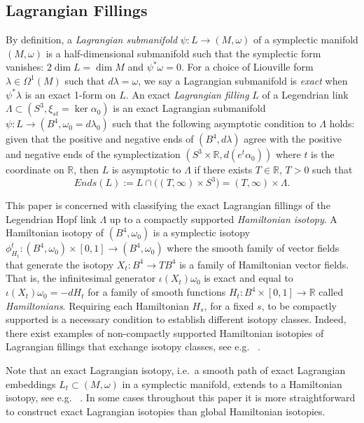 \documentclass[10pt]{amsart}
\theoremstyle{plain}
\theoremstyle{definition}
\numberwithin{equation}{section}
\newcommand{\R}{\mathbb{R}}
\newcommand{\La}{\Lambda}
\newcommand{\sse}{\subset}
\begin{document}
\subsection{Lagrangian Fillings}\label{sec:Lagr_def} By definition, a \textit{Lagrangian submanifold} $\psi:L\to (M,\omega)$ of a symplectic manifold $(M,\omega)$ is a half-dimensional submanifold such that the symplectic form vanishes: $2\dim L = \dim M$ and $\psi^*\omega = 0$. For a choice of Liouville form $\lambda \in \Omega^1(M)$ such that $d\lambda = \omega$, we say a Lagrangian submanifold is \textit{exact} when $\psi^*\lambda$ is an exact 1-form on $L$. An exact \textit{Lagrangian filling} $L$ of a Legendrian link $\La\sse (S^3,\xi_{st}=\ker \alpha_0)$ is an exact Lagrangian submanifold $\psi:L\to (B^4,\omega_0 = d\lambda_0)$ such that the following asymptotic condition to $\La$ holds: given that the positive and negative ends of $(B^4,d\lambda)$ agree with the positive and negative ends of the symplectization $(S^3\times \R, d(e^t\alpha_0))$ where $t$ is the coordinate on $\R$, then $L$ is asymptotic to $\Lambda$ if there exists $T\in \R$, $T>0$ such that
$$Ends(L):=L\cap \big((T,\infty)\times S^3\big) = (T,\infty)\times \Lambda.$$

This paper is concerned with classifying the exact Lagrangian fillings of the Legendrian Hopf link $\Lambda$ up to a compactly supported \textit{Hamiltonian isotopy}. A Hamiltonian isotopy of $(B^4,\omega_0)$ is a symplectic isotopy $\phi^t_{H_t}:(B^4,\omega_0)\times [0,1]\to (B^4,\omega_0)$ where the smooth family of vector fields that generate the isotopy $X_t:B^4\to TB^4$ is a family of Hamiltonian vector fields. That is, the infinitesimal generator $\iota (X_t)\omega_0$ is exact and equal to $\iota (X_t)\omega_0 = -dH_t$ for a family of smooth functions $H_t:B^4\times [0,1]\to \R$ called \textit{Hamiltonians}. Requiring each Hamiltonian $H_s$, for a fixed $s$, to be compactly supported is a necessary condition to establish different isotopy classes. Indeed, there exist examples of non-compactly supported Hamiltonian isotopies of Lagrangian fillings that exchange isotopy classes, see e.g.~ \cite{Casals22_braidloopsinfinitemonodromy}.

Note that an exact Lagrangian isotopy, i.e.~a smooth path of exact Lagrangian embeddings $L_t\sse (M,\omega)$ in a symplectic manifold, extends to a Hamiltonian isotopy, see e.g.~ \cite[Theorem 3.6.7]{Oh15_SymplTopFloerHom}. In some cases throughout this paper it is more straightforward to construct exact Lagrangian isotopies than global Hamiltonian isotopies.
\end{document}
